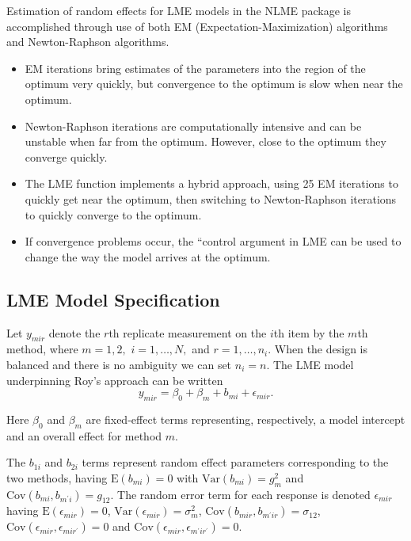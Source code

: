 \documentclass[12pt, a4paper]{report}
\theoremstyle{plain}
\theoremstyle{definition}
\theoremstyle{remark}
\begin{document}
	Estimation of random effects for LME models in the NLME package is accomplished through use
	of both EM (Expectation-Maximization) algorithms and Newton-Raphson algorithms.
	\begin{itemize}
		\item EM iterations bring estimates of the parameters into the region of the optimum very quickly, but
		convergence to the optimum is slow when near the optimum.
		\item Newton-Raphson iterations are computationally intensive and can be unstable when far from the
		optimum. However, close to the optimum they converge quickly.
		\item The LME function implements a hybrid approach, using 25 EM iterations to quickly get near the
		optimum, then switching to Newton-Raphson iterations to quickly converge to the optimum. \item If
		convergence problems occur, the ``control argument in LME can be used to change the way the
		model arrives at the optimum.
	\end{itemize}
	
	
	\subsection{LME Model Specification}
	
	Let $y_{mir} $ denote the $r$th replicate measurement on the $i$th item by the $m$th method, where $m=1,2,$ $i=1,\ldots,N,$ and $r = 1,\ldots,n_i.$ When the design is balanced and there is no ambiguity we can set $n_i=n.$ The LME model underpinning Roy's approach can be written
	\begin{equation}\label{Roy-model}
		y_{mir} = \beta_{0} + \beta_{m} + b_{mi} + \epsilon_{mir}.
	\end{equation}
	
	Here $\beta_0$ and $\beta_m$ are fixed-effect terms representing, respectively, a model intercept and an overall effect for method $m.$ 
	
	The $b_{1i}$ and $b_{2i}$ terms represent random effect parameters corresponding to the two methods, having $\mathrm{E}(b_{mi})=0$ with $\mathrm{Var}(b_{mi})=g^2_m$ and $\mathrm{Cov}(b_{mi}, b_{m^\prime i})=g_{12}.$ The random error term for each response is denoted $\epsilon_{mir}$ having $\mathrm{E}(\epsilon_{mir})=0$, $\mathrm{Var}(\epsilon_{mir})=\sigma^2_m$, $\mathrm{Cov}(b_{mir}, b_{m^\prime ir})=\sigma_{12}$, $\mathrm{Cov}(\epsilon_{mir}, \epsilon_{mir^\prime})= 0$ and $\mathrm{Cov}(\epsilon_{mir}, \epsilon_{m^\prime ir^\prime})= 0.$
	
\end{document}
